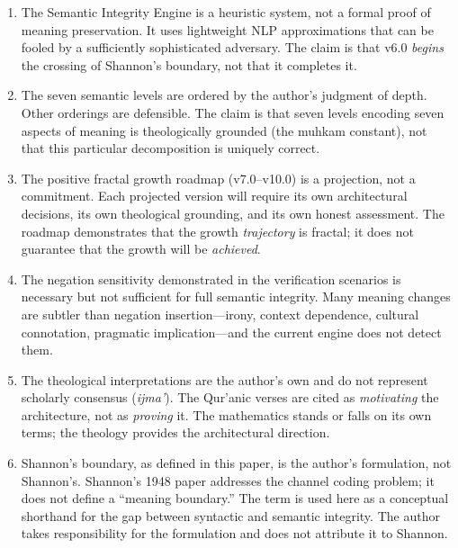 \documentclass[11pt,a4paper]{article}
\begin{document}
\begin{enumerate}[nosep]
    \item The Semantic Integrity Engine is a heuristic system, not a formal proof of meaning preservation. It uses lightweight NLP approximations that can be fooled by a sufficiently sophisticated adversary. The claim is that v6.0 \textit{begins} the crossing of Shannon's boundary, not that it completes it.

    \item The seven semantic levels are ordered by the author's judgment of depth. Other orderings are defensible. The claim is that seven levels encoding seven aspects of meaning is theologically grounded (the muhkam constant), not that this particular decomposition is uniquely correct.

    \item The positive fractal growth roadmap (v7.0--v10.0) is a projection, not a commitment. Each projected version will require its own architectural decisions, its own theological grounding, and its own honest assessment. The roadmap demonstrates that the growth \textit{trajectory} is fractal; it does not guarantee that the growth will be \textit{achieved}.

    \item The negation sensitivity demonstrated in the verification scenarios is necessary but not sufficient for full semantic integrity. Many meaning changes are subtler than negation insertion---irony, context dependence, cultural connotation, pragmatic implication---and the current engine does not detect them.

    \item The theological interpretations are the author's own and do not represent scholarly consensus (\textit{ijma'}). The Qur'anic verses are cited as \textit{motivating} the architecture, not as \textit{proving} it. The mathematics stands or falls on its own terms; the theology provides the architectural direction.

    \item Shannon's boundary, as defined in this paper, is the author's formulation, not Shannon's. Shannon's 1948 paper addresses the channel coding problem; it does not define a ``meaning boundary.'' The term is used here as a conceptual shorthand for the gap between syntactic and semantic integrity. The author takes responsibility for the formulation and does not attribute it to Shannon.
\end{enumerate}
\end{document}
